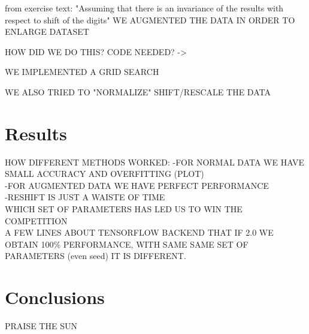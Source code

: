 \documentclass[prl,twocolumn]{revtex4-1}
\begin{document}
from exercise text:
"Assuming that there is an invariance of the results with respect to shift of the digits"
WE AUGMENTED THE DATA IN ORDER TO ENLARGE DATASET

HOW DID WE DO THIS? CODE NEEDED? ->

\medskip

WE IMPLEMENTED A GRID SEARCH

WE ALSO TRIED TO "NORMALIZE" SHIFT/RESCALE THE DATA


\section{Results}

HOW DIFFERENT METHODS WORKED:
-FOR NORMAL DATA WE HAVE SMALL ACCURACY AND OVERFITTING (PLOT)\\
-FOR AUGMENTED DATA WE HAVE PERFECT PERFORMANCE\\
-RESHIFT IS JUST A WAISTE OF TIME\\

WHICH SET OF PARAMETERS HAS LED US TO WIN THE COMPETITION\\

A FEW LINES ABOUT TENSORFLOW BACKEND THAT IF 2.0 WE OBTAIN 100\% PERFORMANCE, WITH SAME SAME SET OF PARAMETERS (even seed) IT IS DIFFERENT. \\


\section{Conclusions}

PRAISE THE SUN

  





\begin{thebibliography}{99}


  
\end{thebibliography}
\end{document}
